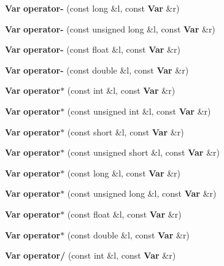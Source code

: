 \begin{CompactItemize}
\item 
{\bf Var} \textbf{operator-} (const long \&l, const {\bf Var} \&r)\label{classVar_005ebec81dea8e554cb4a08ebcdcded9}

\item 
{\bf Var} \textbf{operator-} (const unsigned long \&l, const {\bf Var} \&r)\label{classVar_c76c5561bc9e5b78f2a518255dc5c208}

\item 
{\bf Var} \textbf{operator-} (const float \&l, const {\bf Var} \&r)\label{classVar_2f94ddcb80f049344aabbe51a321a1f4}

\item 
{\bf Var} \textbf{operator-} (const double \&l, const {\bf Var} \&r)\label{classVar_fe92b16eecbf17bf06ec78e89334ab5d}

\item 
{\bf Var} \textbf{operator$\ast$} (const int \&l, const {\bf Var} \&r)\label{classVar_314820b745358a8a8e8401295757cac5}

\item 
{\bf Var} \textbf{operator$\ast$} (const unsigned int \&l, const {\bf Var} \&r)\label{classVar_cac6b65e6ea4b5d054735ca44d0394a5}

\item 
{\bf Var} \textbf{operator$\ast$} (const short \&l, const {\bf Var} \&r)\label{classVar_b9dc1783c652da766d070f84d08d87c8}

\item 
{\bf Var} \textbf{operator$\ast$} (const unsigned short \&l, const {\bf Var} \&r)\label{classVar_de7c96670f5a85ae9c90ae7df1c4e814}

\item 
{\bf Var} \textbf{operator$\ast$} (const long \&l, const {\bf Var} \&r)\label{classVar_10d23b0550458ef7ce050b104c0001c8}

\item 
{\bf Var} \textbf{operator$\ast$} (const unsigned long \&l, const {\bf Var} \&r)\label{classVar_7e468572d8e9c6786915d81e92fdc8b7}

\item 
{\bf Var} \textbf{operator$\ast$} (const float \&l, const {\bf Var} \&r)\label{classVar_59586cd5ae3c745baa9363083043c60d}

\item 
{\bf Var} \textbf{operator$\ast$} (const double \&l, const {\bf Var} \&r)\label{classVar_d11cecbfd89ab58e9f75012c1d7070aa}

\item 
{\bf Var} \textbf{operator/} (const int \&l, const {\bf Var} \&r)\label{classVar_ad62a92437a4bfd0f2efa16702a26cf6}


\end{CompactItemize}
